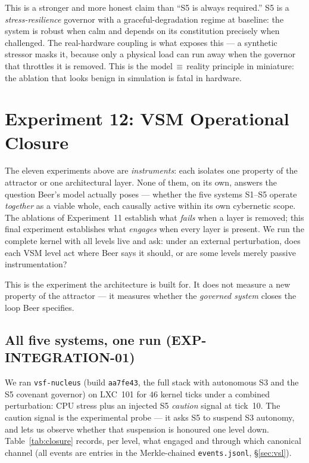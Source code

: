 \documentclass[11pt, a4paper]{article}
\newcommand{\nucleus}{\texttt{vsf-nucleus}}
\begin{document}
This is a stronger and more honest claim than ``S5 is always required.'' S5 is a
\emph{stress-resilience} governor with a graceful-degradation regime at baseline:
the system is robust when calm and depends on its constitution precisely when
challenged. The real-hardware coupling is what exposes this --- a synthetic
stressor masks it, because only a physical load can run away when the governor
that throttles it is removed. This is the model$\,\equiv\,$reality principle in
miniature: the ablation that looks benign in simulation is fatal in hardware.

\section{Experiment 12: VSM Operational Closure}
\label{sec:closure}

The eleven experiments above are \emph{instruments}: each isolates one property of
the attractor or one architectural layer. None of them, on its own, answers the
question Beer's model actually poses --- whether the five systems S1--S5 operate
\emph{together} as a viable whole, each causally active within its own cybernetic
scope. The ablations of Experiment~11 establish what \emph{fails} when a layer is
removed; this final experiment establishes what \emph{engages} when every layer is
present. We run the complete kernel with all levels live and ask: under an external
perturbation, does each VSM level act where Beer says it should, or are some levels
merely passive instrumentation?

This is the experiment the architecture is built for. It does not measure a new
property of the attractor --- it measures whether the \emph{governed system} closes
the loop Beer specifies.

\subsection{All five systems, one run (EXP-INTEGRATION-01)}
\label{sec:int01}

We ran \nucleus{} (build \texttt{aa7fe43}, the full stack with autonomous S3 and the
S5 covenant governor) on LXC~101 for $46$ kernel ticks under a combined perturbation:
CPU stress plus an injected S5 \emph{caution} signal at tick~10. The caution signal
is the experimental probe --- it asks S5 to suspend S3 autonomy, and lets us observe
whether that suspension is honoured one level down. Table~\ref{tab:closure} records,
per level, what engaged and through which canonical channel (all events are entries
in the Merkle-chained \texttt{events.jsonl}, \S\ref{sec:vsl}).
\end{document}
